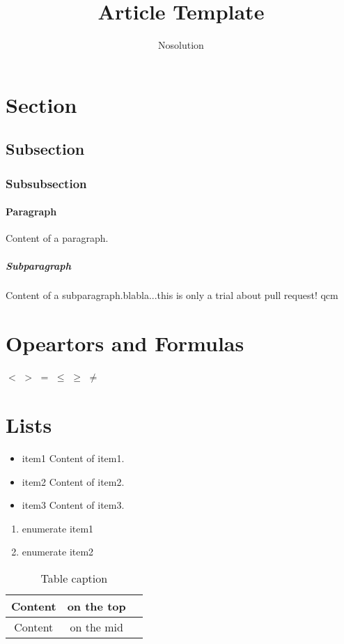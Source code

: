 \documentclass{article}
\title{Article Template}
\author{Nosolution}
\date{}
\begin{document}
    \maketitle
	\section{Section}
	\subsection{Subsection}
    \subsubsection{Subsubsection}
    \paragraph{Paragraph}
    Content of a paragraph.
    \subparagraph{Subparagraph}
    Content of a subparagraph.blabla...this is only a trial about pull request! qcm

    \section{Opeartors and Formulas}
    $<$ $>$ $=$ $\leq$ $\geq$ $\neq$

    \section{Lists}

    \begin{itemize}
        \item{item1} Content of item1.
        \item{item2} Content of item2.
        \item{item3} Content of item3.
    \end{itemize}
    
    \begin{enumerate}
        \item enumerate item1
        \item enumerate item2
    \end{enumerate}


	\begin{center}
		\begin{table}[!htb]
		\begin{tabular}{ccc}
		\toprule  
		Content & on the top\\
		\midrule 
		Content & on the mid\\
		\bottomrule
		\end{tabular}
		\caption{Table caption}
		\end{table}
    \end{center}
    
\end{document}
